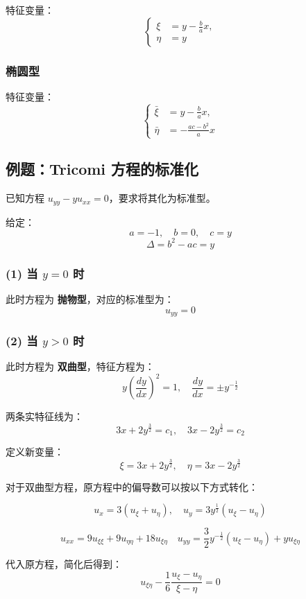 特征变量：
\[
\left\{
\begin{aligned}
\xi &= y - \frac{b}{a} x, \\
\eta &= y
\end{aligned}
\right.
\]

\subsubsection{椭圆型}

特征变量：
\[
\left\{
\begin{aligned}
\bar{\xi} &= y - \frac{b}{a} x, \\
\bar{\eta} &= -\frac{ac-b^2}{a} x
\end{aligned}
\right.
\]

\subsection{例题：Tricomi 方程的标准化}

已知方程 \( u_{yy} - y u_{xx} = 0 \)，要求将其化为标准型。

给定：
\[
a = -1, \quad b = 0, \quad c = y
\]
\[
\Delta = b^2 - ac = y
\]

\subsubsection*{(1) 当 \( y = 0 \) 时}
此时方程为 \textbf{抛物型}，对应的标准型为：
\[
u_{yy} = 0
\]

\subsubsection*{(2) 当 \( y > 0 \) 时}
此时方程为 \textbf{双曲型}，特征方程为：
\[
y \left( \frac{dy}{dx} \right)^2 = 1, \quad \frac{dy}{dx} = \pm y^{-\frac{1}{2}}
\]

两条实特征线为：
\[
3x + 2 y^{\frac{3}{2}} = c_1, \quad 3x - 2 y^{\frac{3}{2}} = c_2
\]

定义新变量：
\[
\xi = 3x + 2 y^{\frac{3}{2}}, \quad \eta = 3x - 2 y^{\frac{3}{2}}
\]

对于双曲型方程，原方程中的偏导数可以按以下方式转化：

\[
u_x = 3 (u_{\xi} + u_{\eta}), \quad u_y = 3 y^{\frac{1}{2}} ( u_{\xi} - u_{\eta} )
\]

\[
u_{xx} = 9 u_{\xi \xi} + 9 u_{\eta \eta} + 18 u_{\xi \eta} \quad u_{yy} = \frac{3}{2} y^{-\frac{1}{2}} (u_{\xi} - u_{\eta}) + y u_{\xi \eta}
\]

代入原方程，简化后得到：
\[
u_{\xi \eta} - \frac{1}{6} \frac{u_{\xi} - u_{\eta}}{\xi - \eta} = 0
\]

